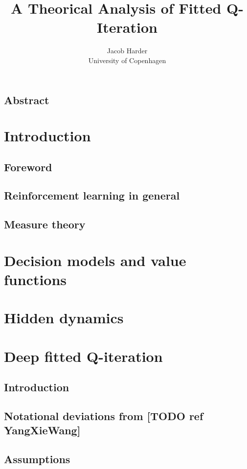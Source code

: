\documentclass{article}
\title{A Theorical Analysis of Fitted Q-Iteration}
\author{Jacob Harder \\ University of Copenhagen}
\begin{document}
\maketitle

\subsection*{Abstract}

\section{Introduction}
\subsection{Foreword}


\subsection{Reinforcement learning in general}

\subsection{Measure theory}


\section{Decision models and value functions}


\section{Hidden dynamics}


\section{Deep fitted Q-iteration}
\subsection{Introduction}

\subsection{Notational deviations from [TODO ref YangXieWang]}

\subsection{Assumptions}

\end{document}

